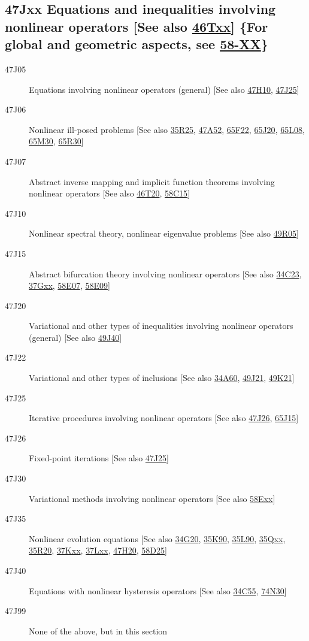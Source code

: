 \subsection*{47Jxx  Equations and inequalities involving nonlinear operators [See also \hyperref[46Txx]{46Txx}] \{For global and geometric aspects, see \hyperref[58-XX]{58-XX}\} }\label{47Jxx}
\begin{description}  
\item [47J05]\label{47J05} Equations involving nonlinear operators (general) [See also \hyperref[47H10]{47H10}, \hyperref[47J25]{47J25}]
\item [47J06]\label{47J06} Nonlinear ill-posed problems [See also \hyperref[35R25]{35R25}, \hyperref[47A52]{47A52}, \hyperref[65F22]{65F22}, \hyperref[65J20]{65J20}, \hyperref[65L08]{65L08}, \hyperref[65M30]{65M30}, \hyperref[65R30]{65R30}]
\item [47J07]\label{47J07} Abstract inverse mapping and implicit function theorems involving nonlinear operators [See also \hyperref[46T20]{46T20}, \hyperref[58C15]{58C15}]
\item [47J10]\label{47J10} Nonlinear spectral theory, nonlinear eigenvalue problems [See also \hyperref[49R05]{49R05}]
\item [47J15]\label{47J15} Abstract bifurcation theory involving nonlinear operators [See also \hyperref[34C23]{34C23}, \hyperref[37Gxx]{37Gxx}, \hyperref[58E07]{58E07}, \hyperref[58E09]{58E09}]
\item [47J20]\label{47J20} Variational and other types of inequalities involving nonlinear operators (general) [See also \hyperref[49J40]{49J40}]
\item [47J22]\label{47J22} Variational and other types of inclusions [See also \hyperref[34A60]{34A60}, \hyperref[49J21]{49J21}, \hyperref[49K21]{49K21}]
\item [47J25]\label{47J25} Iterative procedures involving nonlinear operators [See also \hyperref[47J26]{47J26}, \hyperref[65J15]{65J15}]
\item [47J26]\label{47J26} Fixed-point iterations [See also \hyperref[47J25]{47J25}]
\item [47J30]\label{47J30} Variational methods involving nonlinear operators [See also \hyperref[58Exx]{58Exx}]
\item [47J35]\label{47J35} Nonlinear evolution equations [See also \hyperref[34G20]{34G20}, \hyperref[35K90]{35K90}, \hyperref[35L90]{35L90}, \hyperref[35Qxx]{35Qxx}, \hyperref[35R20]{35R20}, \hyperref[37Kxx]{37Kxx}, \hyperref[37Lxx]{37Lxx}, \hyperref[47H20]{47H20}, \hyperref[58D25]{58D25}]
\item [47J40]\label{47J40} Equations with nonlinear hysteresis operators [See also \hyperref[34C55]{34C55}, \hyperref[74N30]{74N30}]
\item [47J99]\label{47J99} None of the above, but in this section
\end{description}
